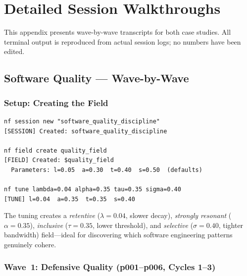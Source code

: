 
\section{Detailed Session Walkthroughs}\label{app:sessions}

This appendix presents wave-by-wave transcripts for both case studies.
All terminal output is reproduced from actual session logs; no numbers
have been edited.


\subsection{Software Quality --- Wave-by-Wave}\label{app:sw-waves}

\subsubsection*{Setup: Creating the Field}

\begin{terminalbox}
\begin{lstlisting}[style=neosshell]
nf session new "software_quality_discipline"
[SESSION] Created: software_quality_discipline

nf field create quality_field
[FIELD] Created: $quality_field
  Parameters: l=0.05  a=0.30  t=0.40  s=0.50  (defaults)

nf tune lambda=0.04 alpha=0.35 tau=0.35 sigma=0.40
[TUNE] l=0.04  a=0.35  t=0.35  s=0.40
\end{lstlisting}
\end{terminalbox}

\noindent
The tuning creates a \emph{retentive} ($\lambda = 0.04$, slower decay),
\emph{strongly resonant} ($\alpha = 0.35$), \emph{inclusive}
($\tau = 0.35$, lower threshold), and \emph{selective}
($\sigma = 0.40$, tighter bandwidth) field---ideal for discovering which
software engineering patterns genuinely cohere.

\subsubsection*{Wave~1: Defensive Quality (p001--p006, Cycles 1--3)}

